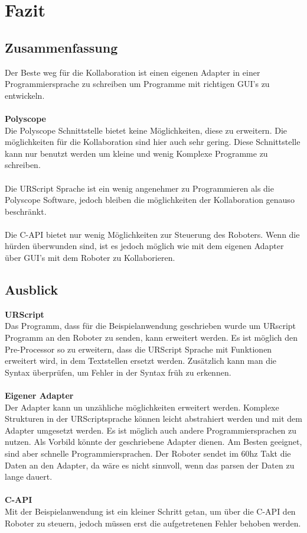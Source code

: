 \chapter{Fazit}

\section{Zusammenfassung}
\label{sec:Zusammenfassung}

Der Beste weg für die Kollaboration ist einen eigenen Adapter in einer Programmiersprache zu schreiben um Programme mit richtigen \ac{GUI}'s zu entwickeln.
\\\\
\textbf{Polyscope}\\
Die Polyscope Schnittstelle bietet keine Möglichkeiten, diese zu erweitern. Die möglichkeiten für die Kollaboration sind hier auch sehr gering. Diese Schnittstelle kann nur benutzt werden um kleine und wenig Komplexe Programme zu schreiben.
\\\\
Die URScript Sprache ist ein wenig angenehmer zu Programmieren als die Polyscope Software, jedoch bleiben die möglichkeiten der Kollaboration genauso beschränkt.
\\\\
Die C-\ac{API} bietet nur wenig Möglichkeiten zur Steuerung des Roboters. Wenn die hürden überwunden sind, ist es jedoch möglich wie mit dem eigenen Adapter über \ac{GUI}'s mit dem Roboter zu Kollaborieren.

\section{Ausblick}
\label{sec:ausblick}

\textbf{URScript}\\
Das Programm, dass für die Beispielanwendung geschrieben wurde um URscript Programm an den Roboter zu senden, kann erweitert werden. Es ist möglich den Pre-Processor so zu erweitern, dass die URScript Sprache mit Funktionen erweitert wird, in dem Textstellen ersetzt werden. Zusätzlich kann man die Syntax überprüfen, um Fehler in der Syntax früh zu erkennen.
\\\\
\textbf{Eigener Adapter}\\
Der Adapter kann un unzähliche möglichkeiten erweitert werden. Komplexe Strukturen in der URScriptsprache können leicht abstrahiert werden und mit dem Adapter umgesetzt werden. Es ist möglich auch andere Programmiersprachen zu nutzen. Als Vorbild könnte der geschriebene Adapter dienen. Am Besten geeignet, sind aber schnelle Programmiersprachen. Der Roboter sendet im 60hz Takt die Daten an den Adapter, da wäre es nicht sinnvoll, wenn das \ac{parsen} der Daten zu lange dauert.
\\\\
\textbf{C-API}\\
Mit der Beispielanwendung ist ein kleiner Schritt getan, um über die C-API den Roboter zu steuern, jedoch müssen erst die aufgetretenen Fehler behoben werden.